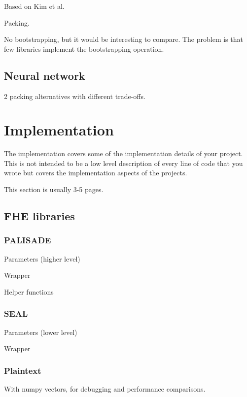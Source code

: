 \documentclass[a4paper,11pt,oneside]{report}
\begin{document}
Based on Kim et al. ~\cite{kim_logistic_2018}

Packing.

No bootstrapping, but it would be interesting to compare. The problem is that few libraries implement the bootstrapping operation.

\section{Neural network}

2 packing alternatives with different trade-offs.



\chapter{Implementation}

The implementation covers some of the implementation details of your project.
This is not intended to be a low level description of every line of code that
you wrote but covers the implementation aspects of the projects.

This section is usually 3-5 pages.

\section{FHE libraries}

\subsection{PALISADE}

Parameters (higher level)

Wrapper

Helper functions

\subsection{SEAL}

Parameters (lower level)

Wrapper

\subsection{Plaintext}

With numpy vectors, for debugging and performance comparisons.
\end{document}
